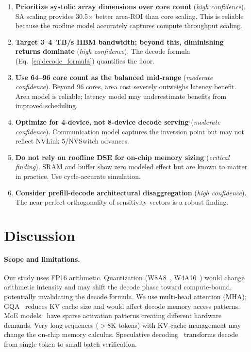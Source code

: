 \documentclass[sigconf,10pt]{acmart}
\begin{document}
\begin{enumerate}
\item \textbf{Prioritize systolic array dimensions over core count}
(\emph{high confidence}). SA scaling provides 30.5$\times$ better
area-ROI than core scaling. This is reliable because the roofline
model accurately captures compute throughput scaling.

\item \textbf{Target 3--4~TB/s HBM bandwidth; beyond this, diminishing
returns dominate} (\emph{high confidence}). The decode formula
(Eq.~\ref{eq:decode_formula}) quantifies the floor.

\item \textbf{Use 64--96 core count as the balanced mid-range}
(\emph{moderate confidence}). Beyond 96 cores, area cost severely
outweighs latency benefit. Area model is reliable; latency model may
underestimate benefits from improved scheduling.

\item \textbf{Optimize for 4-device, not 8-device decode serving}
(\emph{moderate confidence}). Communication model captures the
inversion point but may not reflect NVLink 5/NVSwitch advances.

\item \textbf{Do not rely on roofline DSE for on-chip memory sizing}
(\emph{critical finding}). SRAM and buffer show zero modeled effect
but are known to matter in practice. Use cycle-accurate simulation.

\item \textbf{Consider prefill-decode architectural disaggregation}
(\emph{high confidence}). The near-perfect orthogonality of
sensitivity vectors is a robust finding.
\end{enumerate}

\section{Discussion}
\label{sec:discussion}

\paragraph{Scope and limitations.}
Our study uses FP16 arithmetic. Quantization
(W8A8~\cite{xiao2023smoothquant}, W4A16~\cite{lin2024awq,frantar2023gptq})
would change arithmetic intensity and may shift the decode phase toward
compute-bound, potentially invalidating the decode formula. We use
multi-head attention (MHA); GQA~\cite{ainslie2023gqa} reduces KV cache
size and would affect decode memory access patterns. MoE
models~\cite{hwang2024pregated,tutel2023} have sparse activation
patterns creating different hardware demands. Very long sequences
($>$8K tokens) with KV-cache management may change the on-chip memory
calculus. Speculative decoding~\cite{leviathan2023fast} transforms
decode from single-token to small-batch verification.
\end{document}

